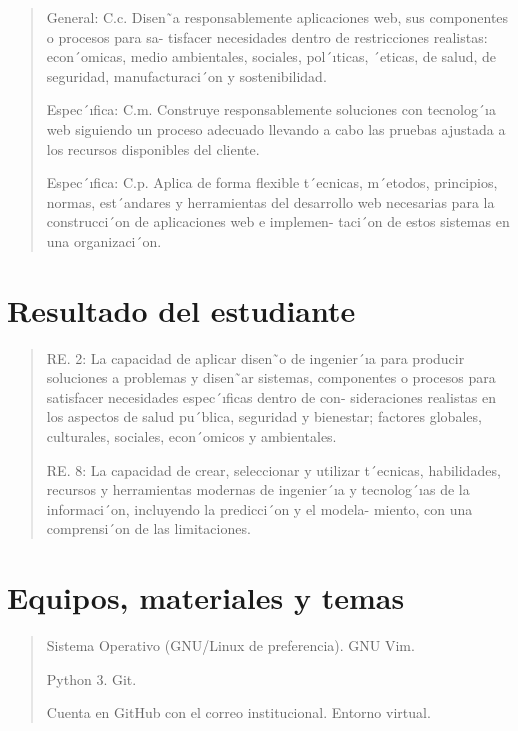 \documentclass[
]{article}
\begin{document}
\begin{quote}
General: C.c. Disen˜a responsablemente aplicaciones web, sus componentes
o procesos para sa- tisfacer necesidades dentro de restricciones
realistas: econ´omicas, medio ambientales, sociales, pol´ıticas,
´eticas, de salud, de seguridad, manufacturaci´on y sostenibilidad.

Espec´ıfica: C.m. Construye responsablemente soluciones con tecnolog´ıa
web siguiendo un proceso adecuado llevando a cabo las pruebas ajustada a
los recursos disponibles del cliente.

Espec´ıfica: C.p. Aplica de forma flexible t´ecnicas, m´etodos,
principios, normas, est´andares y herramientas del desarrollo web
necesarias para la construcci´on de aplicaciones web e implemen- taci´on
de estos sistemas en una organizaci´on.
\end{quote}

\hypertarget{resultado-del-estudiante}{%
\section{Resultado del estudiante}\label{resultado-del-estudiante}}

\begin{quote}
RE. 2: La capacidad de aplicar disen˜o de ingenier´ıa para producir
soluciones a problemas y disen˜ar sistemas, componentes o procesos para
satisfacer necesidades espec´ıficas dentro de con- sideraciones
realistas en los aspectos de salud pu´blica, seguridad y bienestar;
factores globales, culturales, sociales, econ´omicos y ambientales.

RE. 8: La capacidad de crear, seleccionar y utilizar t´ecnicas,
habilidades, recursos y herramientas modernas de ingenier´ıa y
tecnolog´ıas de la informaci´on, incluyendo la predicci´on y el modela-
miento, con una comprensi´on de las limitaciones.
\end{quote}

\hypertarget{equipos-materiales-y-temas}{%
\section{Equipos, materiales y temas}\label{equipos-materiales-y-temas}}

\begin{quote}
Sistema Operativo (GNU/Linux de preferencia). GNU Vim.

Python 3. Git.

Cuenta en GitHub con el correo institucional. Entorno virtual.
\end{quote}
\end{document}
